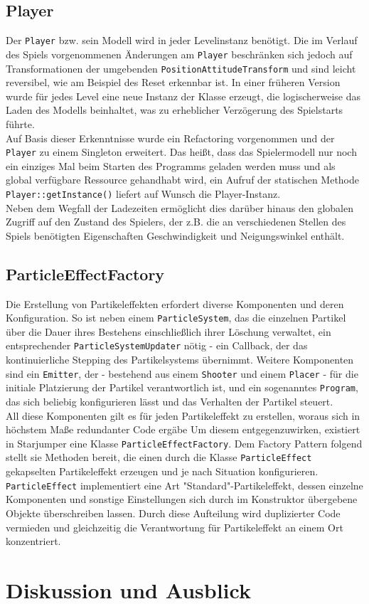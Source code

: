 \documentclass{llncs}
\begin{document}
\subsection{Player}
Der \texttt{Player} bzw. sein Modell wird in jeder Levelinstanz ben\"otigt. Die im Verlauf des Spiels vorgenommenen \"Anderungen
am \texttt{Player} beschr\"anken sich jedoch auf Transformationen der umgebenden \texttt{PositionAttitudeTransform} und sind leicht reversibel,
wie am Beispiel des Reset erkennbar ist. In einer fr\"uheren Version wurde f\"ur jedes Level eine neue Instanz der Klasse
erzeugt, die logischerweise das Laden des Modells beinhaltet, was zu erheblicher Verz\"ogerung des Spielstarts f\"uhrte.\\
Auf Basis dieser Erkenntnisse wurde ein Refactoring vorgenommen und der \texttt{Player} zu einem Singleton erweitert. Das hei\ss t,
dass das Spielermodell nur noch ein einziges Mal beim Starten des Programms geladen werden muss und als global verf\"ugbare
Ressource gehandhabt wird, ein Aufruf der statischen Methode \texttt{Player::getInstance()} liefert auf Wunsch die Player-Instanz.\\
Neben dem Wegfall der Ladezeiten erm\"oglicht dies dar\"uber hinaus den globalen Zugriff auf den Zustand des Spielers,
der z.B. die an verschiedenen Stellen des Spiels ben\"otigten Eigenschaften Geschwindigkeit und Neigungswinkel enth\"alt.

\subsection{ParticleEffectFactory}
Die Erstellung von Partikeleffekten erfordert diverse Komponenten und deren Konfiguration. So ist neben einem \texttt{ParticleSystem}, das
die einzelnen Partikel \"uber die Dauer ihres Bestehens einschlie\ss lich ihrer L\"oschung verwaltet, ein entsprechender
\texttt{ParticleSystemUpdater} n\"otig - ein Callback, der das kontinuierliche Stepping des Partikelsystems \"ubernimmt. Weitere Komponenten
sind ein \texttt{Emitter}, der - bestehend aus einem \texttt{Shooter} und einem \texttt{Placer} - f\"ur die initiale Platzierung der Partikel verantwortlich
ist, und ein sogenanntes \texttt{Program}, das sich beliebig konfigurieren l\"asst und das Verhalten der Partikel steuert.\\
All diese Komponenten gilt es f\"ur jeden Partikeleffekt zu erstellen, woraus sich in h\"ochstem Ma\ss e redundanter Code erg\"abe
Um diesem entgegenzuwirken, existiert in Starjumper eine Klasse \texttt{ParticleEffectFactory}. Dem Factory Pattern folgend stellt sie Methoden
bereit, die einen durch die Klasse \texttt{ParticleEffect} gekapselten Partikeleffekt erzeugen und je nach Situation konfigurieren.\\
\texttt{ParticleEffect} implementiert eine Art "Standard"-Partikeleffekt, dessen einzelne Komponenten und sonstige Einstellungen sich
durch im Konstruktor \"ubergebene Objekte \"uberschreiben lassen. Durch diese Aufteilung wird duplizierter Code vermieden und
gleichzeitig die Verantwortung f\"ur Partikeleffekt an einem Ort konzentriert.


\section{Diskussion und Ausblick}
\end{document}
